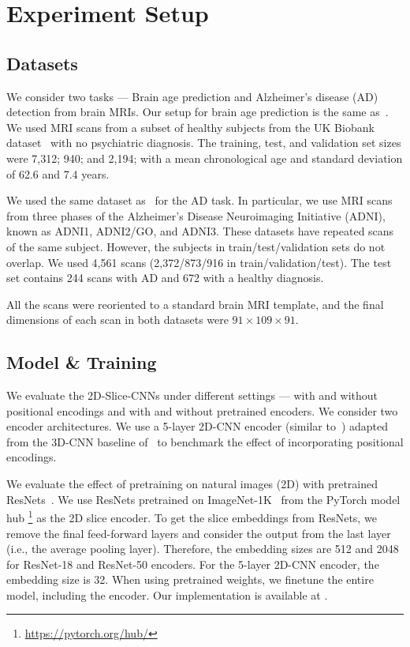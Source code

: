 \section{Experiment Setup}

\subsection{Datasets}


We consider two tasks --- Brain age prediction and Alzheimer's disease (AD) detection from brain MRIs.
Our setup for brain age prediction is the same as~\cite{gupta2021improved}.
We used MRI scans from a subset of healthy subjects from the UK Biobank dataset~\cite{ukbb} with no psychiatric diagnosis.  The training, test, and validation set sizes were 7,312; 940; and 2,194; with a mean chronological age and standard deviation of 62.6 and 7.4 years.

We used the same dataset as~\cite{lam20203d} for the AD task. In particular, we use MRI scans from three phases of the  Alzheimer’s Disease Neuroimaging Initiative (ADNI), known as ADNI1,
ADNI2/GO, and ADNI3. These datasets have repeated scans of the same subject. However, the subjects in train/test/validation sets do not overlap. We used
4,561 scans (2,372/873/916 in train/validation/test).  The test set contains 244 scans with AD and 672 with a healthy diagnosis.

All the scans were reoriented to a standard brain MRI template, and the final dimensions of each scan in both datasets were $91\times109\times91$.

\subsection{Model \& Training}
We evaluate the 2D-Slice-CNNs under different settings --- with and without positional encodings and with and without pretrained encoders. We consider two encoder architectures.  We use a 5-layer 2D-CNN  encoder (similar to~\cite{gupta2021improved, lam2020accurate}) adapted from the 3D-CNN baseline of~\cite{peng2019accurate} to benchmark the effect of incorporating positional encodings.

We evaluate the effect of pretraining on natural images (2D) with pretrained ResNets~\cite{he2016deep}. We use ResNets pretrained on ImageNet-1K~\cite{deng2009imagenet} from the PyTorch model hub%
\footnote{\url{https://pytorch.org/hub/}}
as the 2D slice encoder. To get the slice embeddings from ResNets, we remove the final feed-forward layers and consider the output from the last layer (i.e., the average pooling layer). Therefore, the embedding sizes are 512 and 2048 for ResNet-18 and ResNet-50 encoders. For the 5-layer 2D-CNN encoder, the  embedding size is 32. When using pretrained weights, we finetune the entire model, including the encoder. Our implementation is available at \codeurl. 



